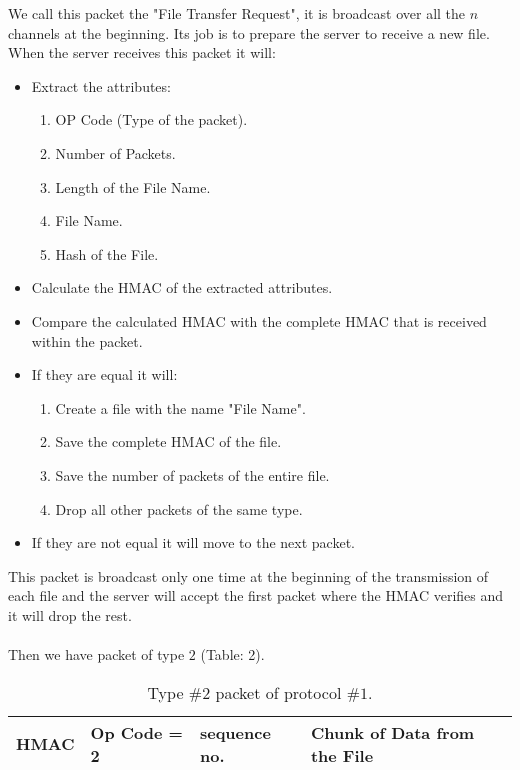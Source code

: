 \documentclass[main.tex]{subfiles}
\begin{document}
We call this packet the "File Transfer Request", it is broadcast over all the $n$ channels at the beginning. Its job is to prepare the server to receive a new file. When the server receives this packet it will: 
\begin{itemize}
\item Extract the attributes:
\begin{enumerate}
\item OP Code (Type of the packet).
\item Number of Packets.
\item Length of the File Name.
\item File Name.
\item Hash of the File.
\end{enumerate}
\item Calculate the HMAC of the extracted attributes.
\item Compare the calculated HMAC with the complete HMAC that is received within the packet.
\item If they are equal it will:
\begin{enumerate}
\item Create a file with the name "File Name".
\item Save the complete HMAC of the file.
\item Save the number of packets of the entire file.
\item Drop all other packets of the same type.
\end{enumerate}
\item If they are not equal it will move to the next packet.
\end{itemize} 
This packet is broadcast only one time at the beginning of the transmission of each file and the server will accept the first packet where the HMAC verifies and it will drop the rest.
\paragraph{}
Then we have packet of type $2$ (Table: 2).\\

\renewcommand{\arraystretch}{2}
\begin{table*}[h!]
\begin{center}
\begin{tabu} to 0.9\textwidth { | X[c]  | X[c]  | X[c]  | X[c] | }
 \hline
 HMAC & Op Code = 2 & sequence no. & Chunk of Data from the File\\
\hline
\end{tabu}
\caption{Type \#$2$ packet of protocol \#$1$.}
    \label{tab:table$2$}
\end{center}
\end{table*}
\end{document}
